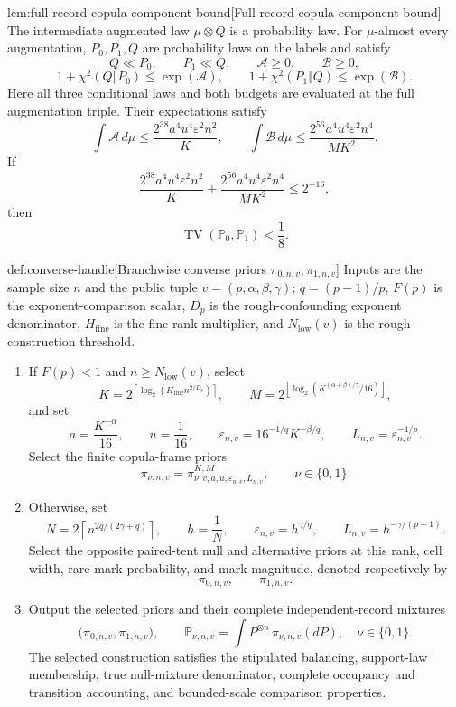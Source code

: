 \begin{lemmav}{lem:full-record-copula-component-bound}[Full-record copula component bound]
The intermediate augmented law \(\mu\otimes Q\) is a probability law. For \(\mu\)-almost every augmentation, \(P_0,P_1,Q\) are probability laws on the labels and satisfy
\[
Q\ll P_0,\qquad P_1\ll Q,\qquad
\mathcal A\ge0,\qquad \mathcal B\ge0,
\]
\[
1+\chi^2(Q\Vert P_0)\le \exp(\mathcal A),
\qquad
1+\chi^2(P_1\Vert Q)\le \exp(\mathcal B).
\]
Here all three conditional laws and both budgets are evaluated at the full augmentation triple. Their expectations satisfy
\[
\int \mathcal A\,d\mu
\le \frac{2^{38}a^4u^4\varepsilon^2 n^2}{K},
\qquad
\int \mathcal B\,d\mu
\le \frac{2^{56}a^4u^4\varepsilon^2 n^4}{MK^2}.
\]
If
\[
\frac{2^{38}a^4u^4\varepsilon^2 n^2}{K}
+
\frac{2^{56}a^4u^4\varepsilon^2 n^4}{MK^2}
\le 2^{-16},
\]
then
\[
\operatorname{TV}(\mathbb P_0,\mathbb P_1)<\frac18.
\]
\end{lemmav}

\begin{algorithmv}{def:converse-handle}[Branchwise converse priors \(\pi_{0,n,v},\pi_{1,n,v}\)]
Inputs are the sample size \(n\) and the public tuple \(v=(p,\alpha,\beta,\gamma)\); \(q=(p-1)/p\), \(F(p)\) is the exponent-comparison scalar, \(D_p\) is the rough-confounding exponent denominator, \(H_{\mathrm{fine}}\) is the fine-rank multiplier, and \(N_{\mathrm{low}}(v)\) is the rough-construction threshold.
\begin{enumerate}
\item If \(F(p)<1\) and \(n\ge N_{\mathrm{low}}(v)\), select
\[
K=2^{\left\lceil\log_2\!\left(H_{\mathrm{fine}}n^{2/D_p}\right)\right\rceil},
\qquad
M=2^{\left\lfloor\log_2\!\left(K^{(\alpha+\beta)/\gamma}/16\right)\right\rfloor},
\]
and set
\[
a=\frac{K^{-\alpha}}{16},
\qquad
u=\frac1{16},
\qquad
\varepsilon_{n,v}=16^{-1/q}K^{-\beta/q},
\qquad
L_{n,v}=\varepsilon_{n,v}^{-1/p}.
\]
Select the finite copula-frame priors
\[
\pi_{\nu,n,v}
=
\pi^{K,M}_{\nu;v,a,u,\varepsilon_{n,v},L_{n,v}},
\qquad \nu\in\{0,1\}.
\]
\item Otherwise, set
\[
N=2\left\lceil n^{2q/(2\gamma+q)}\right\rceil,
\qquad
h=\frac1N,
\qquad
\varepsilon_{n,v}=h^{\gamma/q},
\qquad
L_{n,v}=h^{-\gamma/(p-1)}.
\]
Select the opposite paired-tent null and alternative priors at this rank, cell width, rare-mark probability, and mark magnitude, denoted respectively by
\[
\pi_{0,n,v},\qquad \pi_{1,n,v}.
\]
\item Output the selected priors and their complete independent-record mixtures
\[
\bigl(\pi_{0,n,v},\pi_{1,n,v}\bigr),
\qquad
\mathbb P_{\nu,n,v}
=
\int P^{\otimes n}\,\pi_{\nu,n,v}(dP),
\quad \nu\in\{0,1\}.
\]
The selected construction satisfies the stipulated balancing, support-law membership, true null-mixture denominator, complete occupancy and transition accounting, and bounded-scale comparison properties.
\end{enumerate}
\end{algorithmv}

